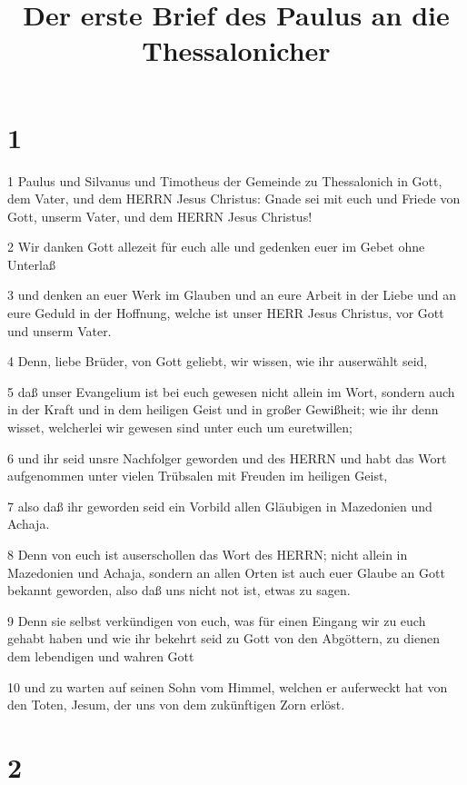 

\title{Der erste Brief des Paulus an die Thessalonicher}


\chapter{1}

\par 1 Paulus und Silvanus und Timotheus der Gemeinde zu Thessalonich in Gott, dem Vater, und dem HERRN Jesus Christus: Gnade sei mit euch und Friede von Gott, unserm Vater, und dem HERRN Jesus Christus!
\par 2 Wir danken Gott allezeit für euch alle und gedenken euer im Gebet ohne Unterlaß
\par 3 und denken an euer Werk im Glauben und an eure Arbeit in der Liebe und an eure Geduld in der Hoffnung, welche ist unser HERR Jesus Christus, vor Gott und unserm Vater.
\par 4 Denn, liebe Brüder, von Gott geliebt, wir wissen, wie ihr auserwählt seid,
\par 5 daß unser Evangelium ist bei euch gewesen nicht allein im Wort, sondern auch in der Kraft und in dem heiligen Geist und in großer Gewißheit; wie ihr denn wisset, welcherlei wir gewesen sind unter euch um euretwillen;
\par 6 und ihr seid unsre Nachfolger geworden und des HERRN und habt das Wort aufgenommen unter vielen Trübsalen mit Freuden im heiligen Geist,
\par 7 also daß ihr geworden seid ein Vorbild allen Gläubigen in Mazedonien und Achaja.
\par 8 Denn von euch ist auserschollen das Wort des HERRN; nicht allein in Mazedonien und Achaja, sondern an allen Orten ist auch euer Glaube an Gott bekannt geworden, also daß uns nicht not ist, etwas zu sagen.
\par 9 Denn sie selbst verkündigen von euch, was für einen Eingang wir zu euch gehabt haben und wie ihr bekehrt seid zu Gott von den Abgöttern, zu dienen dem lebendigen und wahren Gott
\par 10 und zu warten auf seinen Sohn vom Himmel, welchen er auferweckt hat von den Toten, Jesum, der uns von dem zukünftigen Zorn erlöst.

\chapter{2}

